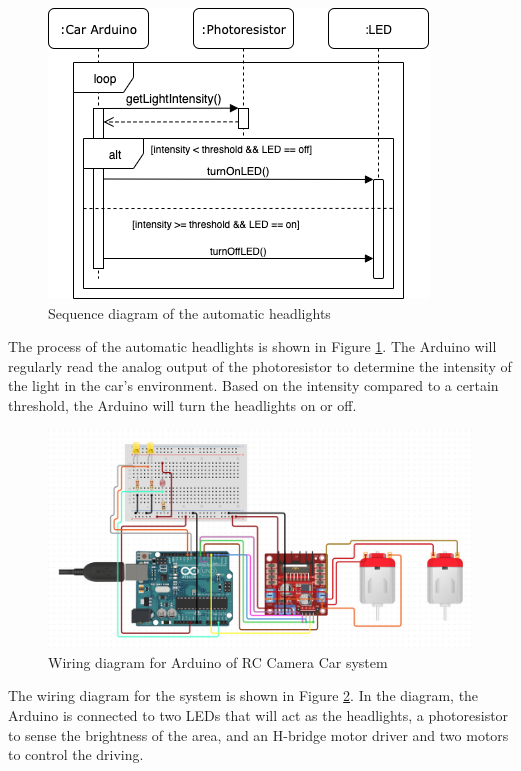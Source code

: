 \documentclass[letterpaper,12pt]{report}
\begin{document}
	\begin{figure}[H]
    	\centering
		\includegraphics[width=0.75\linewidth]{diagrams/Proposal_Automatic_Headlights_Sequence.png}
    	\caption{Sequence diagram of the automatic headlights}
    	\label{fig:headlights}
	\end{figure}

	The process of the automatic headlights is shown in Figure
	\ref{fig:headlights}. The Arduino will regularly read the analog output of
	the photoresistor to determine the intensity of the light in the car's
	environment. Based on the intensity compared to a certain threshold, the
	Arduino will turn the headlights on or off.

	\begin{figure}[H]
    	\centering
		\includegraphics[width=\linewidth]{diagrams/Proposal_Wiring_Diagram.png}
    	\caption{Wiring diagram for Arduino of RC Camera Car system}
    	\label{fig:wiring}
	\end{figure}

	The wiring diagram for the system is shown in Figure \ref{fig:wiring}. In
	the diagram, the Arduino is connected to two LEDs that will act as the
	headlights, a photoresistor to sense the brightness of the area, and an
	H-bridge motor driver and two motors to control the driving.
\end{document}
